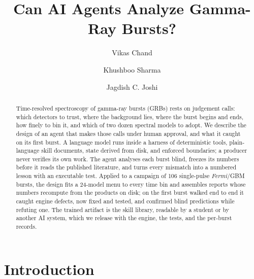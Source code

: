 \documentclass[twocolumn]{aastex631}
\begin{document}
\title{Can AI Agents Analyze Gamma-Ray Bursts?}

\author{Vikas Chand}

\author{Khushboo Sharma}

\author{Jagdish C. Joshi}

\begin{abstract}
Time-resolved spectroscopy of gamma-ray bursts (GRBs) rests on judgement
calls: which detectors to trust, where the background lies, where the
burst begins and ends, how finely to bin it, and which of two dozen
spectral models to adopt. We describe the design of an agent that makes
those calls under human approval, and what it caught on its first burst.
A language model runs inside a harness of deterministic tools,
plain-language skill documents, state derived from disk, and enforced
boundaries; a producer never verifies its own work. The agent analyses
each burst blind, freezes its numbers before it reads the published
literature, and turns every mismatch into a numbered lesson with an
executable test. Applied to a campaign of 106 single-pulse
\textit{Fermi}/GBM bursts, the design fits a 24-model menu to every time
bin and assembles reports whose numbers recompute from the products on
disk; on the first burst walked end to end it caught engine defects, now
fixed and tested, and confirmed blind predictions while refuting one.
The trained artifact is the skill library, readable by a student or by
another AI system, which we release with the engine, the tests, and the
per-burst records.
\end{abstract}


\section{Introduction} \label{sec:intro}
\end{document}
